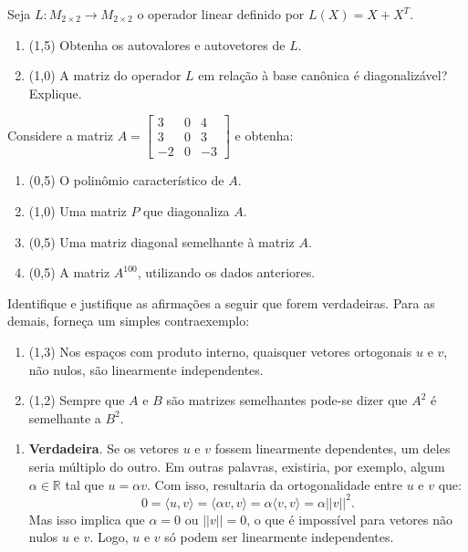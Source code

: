 \documentclass[12pt,a4paper]{article}
\newcommand{\fixme}{{\color{red}(...)}}
\newcommand{\norm}[1]{\left|\left|{#1}\right|\right|}
\newcommand*\R{\mathbb{R}}
\begin{document}
\begin{ExerciseList}
\Exercise[title={2,5}] Seja $L: M_{2\times 2} \to M_{2\times 2}$ o operador linear definido por $L(X) = X + X^T$.
\begin{enumerate}
\item (1,5) Obtenha os autovalores e autovetores de $L$.
\item (1,0) A matriz do operador $L$ em relação à base canônica é diagonalizável? Explique.
\end{enumerate}
\Answer \fixme


\Exercise[title={2,5}] Considere a matriz $A =
\begin{bmatrix}
 3 &  0 &  4\\
 3 &  0 &  3\\
-2 &  0 & -3
\end{bmatrix}$ e obtenha:
\begin{enumerate}
\item (0,5) O polinômio característico de $A$.
\item (1,0) Uma matriz $P$ que diagonaliza $A$.
\item (0,5) Uma matriz diagonal semelhante à matriz $A$.
\item (0,5) A matriz $A^{100}$, utilizando os dados anteriores.
\end{enumerate}
\Answer \fixme


\Exercise[title={2,5}] Identifique e justifique as afirmações a seguir que forem verdadeiras. Para as demais, forneça um simples contraexemplo:
\begin{enumerate}
\item (1,3) Nos espaços com produto interno, quaisquer vetores ortogonais $u$ e $v$, não nulos, são linearmente independentes.
\item (1,2) Sempre que $A$ e $B$ são matrizes semelhantes pode-se dizer que $A^2$ é semelhante a $B^2$.
\end{enumerate}
\Answer
\begin{enumerate}
\item \textbf{Verdadeira}. Se os vetores $u$ e $v$ fossem linearmente dependentes, um deles seria múltiplo do outro. Em outras palavras, existiria, por exemplo, algum $\alpha \in \R$ tal que $u = \alpha v$. Com isso, resultaria da ortogonalidade entre $u$ e $v$ que:
\[
0
= \langle u,v \rangle
= \langle \alpha v, v \rangle
= \alpha \langle v, v \rangle
= \alpha \norm{v}^2.
\]
Mas isso implica que $\alpha = 0$ ou $\norm{v} = 0$, o que é impossível para vetores não nulos $u$ e $v$. Logo, $u$ e $v$ só podem ser linearmente independentes.


\end{enumerate}
\end{ExerciseList}
\end{document}

